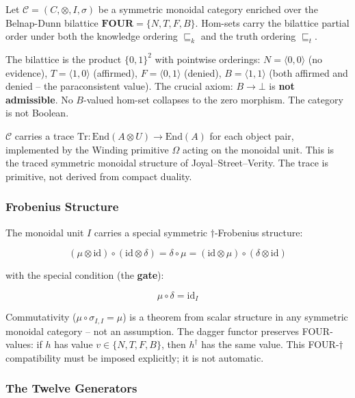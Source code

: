 Let \(\mathcal{C} = (C, \otimes, I, \sigma)\) be a symmetric monoidal
category enriched over the Belnap-Dunn bilattice
\(\mathbf{FOUR} = \{N, T, F, B\}\). Hom-sets carry the bilattice partial
order under both the knowledge ordering \(\sqsubseteq_k\) and the truth
ordering \(\sqsubseteq_t\).

The bilattice is the product \(\{0,1\}^2\) with pointwise orderings:
\(N = \langle 0,0 \rangle\) (no evidence), \(T = \langle 1,0 \rangle\)
(affirmed), \(F = \langle 0,1 \rangle\) (denied),
\(B = \langle 1,1 \rangle\) (both affirmed and denied -- the
paraconsistent value). The crucial axiom: \(B \to \bot\) is \textbf{not
admissible}. No \(B\)-valued hom-set collapses to the zero morphism. The
category is not Boolean.

\(\mathcal{C}\) carries a trace
\(\mathrm{Tr}: \mathrm{End}(A \otimes U) \to \mathrm{End}(A)\) for each
object pair, implemented by the Winding primitive \(\Omega\) acting on
the monoidal unit. This is the traced symmetric monoidal structure of
Joyal--Street--Verity. The trace is primitive, not derived from compact
duality.

\hypertarget{frobenius-structure}{%
\subsubsection{Frobenius Structure}\label{frobenius-structure}}

The monoidal unit \(I\) carries a special symmetric
\(\dagger\)-Frobenius structure:

\[(\mu \otimes \mathrm{id}) \circ (\mathrm{id} \otimes \delta) = \delta \circ \mu = (\mathrm{id} \otimes \mu) \circ (\delta \otimes \mathrm{id})\]

with the special condition (the \textbf{gate}):

\[\mu \circ \delta = \mathrm{id}_I\]

Commutativity (\(\mu \circ \sigma_{I,I} = \mu\)) is a theorem from
scalar structure in any symmetric monoidal category -- not an
assumption. The dagger functor preserves FOUR-values: if \(h\) has value
\(v \in \{N, T, F, B\}\), then \(h^\dagger\) has the same value. This
FOUR-\(\dagger\) compatibility must be imposed explicitly; it is not
automatic.

\hypertarget{the-twelve-generators}{%
\subsubsection{The Twelve Generators}\label{the-twelve-generators}}


